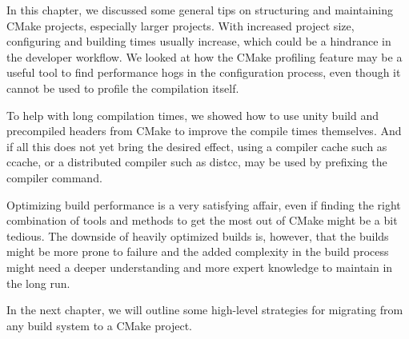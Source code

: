 In this chapter, we discussed some general tips on structuring and maintaining CMake projects, especially larger projects. With increased project size, configuring and building times usually increase, which could be a hindrance in the developer workflow. We looked at how the CMake profiling feature may be a useful tool to find performance hogs in the configuration process, even though it cannot be used to profile the compilation itself.

To help with long compilation times, we showed how to use unity build and precompiled headers from CMake to improve the compile times themselves. And if all this does not yet bring the desired effect, using a compiler cache such as ccache, or a distributed compiler such as distcc, may be used by prefixing the compiler command.

Optimizing build performance is a very satisfying affair, even if finding the right combination of tools and methods to get the most out of CMake might be a bit tedious. The downside of heavily optimized builds is, however, that the builds might be more prone to failure and the added complexity in the build process might need a deeper understanding and more expert knowledge to maintain in the long run.

In the next chapter, we will outline some high-level strategies for migrating from any build system to a CMake project.